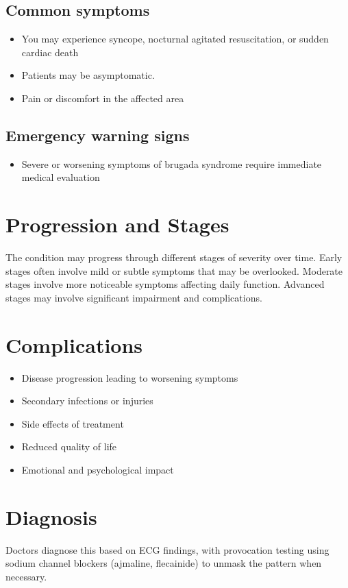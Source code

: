 \subsection{Common symptoms}
\begin{itemize}[noitemsep]
  \item You may experience syncope, nocturnal agitated resuscitation, or sudden cardiac death
  \item Patients may be asymptomatic.
  \item Pain or discomfort in the affected area
  \end{itemize}

\subsection{Emergency warning signs}
\begin{itemize}[noitemsep]
  \item Severe or worsening symptoms of brugada syndrome require immediate medical evaluation
\end{itemize}
\section{Progression and Stages}
The condition may progress through different stages of severity over time. Early stages often involve mild or subtle symptoms that may be overlooked. Moderate stages involve more noticeable symptoms affecting daily function. Advanced stages may involve significant impairment and complications.
\section{Complications}
\begin{itemize}[noitemsep]
  \item Disease progression leading to worsening symptoms
  \item Secondary infections or injuries
  \item Side effects of treatment
  \item Reduced quality of life
  \item Emotional and psychological impact
\end{itemize}
\section{Diagnosis}
Doctors diagnose this based on ECG findings, with provocation testing using sodium channel blockers (ajmaline, flecainide) to unmask the pattern when necessary.

